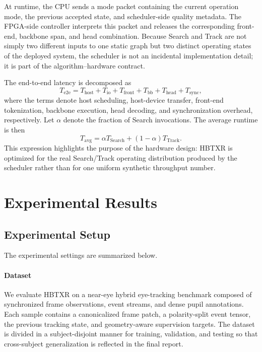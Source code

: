 \documentclass[journal]{IEEEtran}
\begin{document}
At runtime, the CPU sends a mode packet containing the current operation mode, the previous accepted state, and scheduler-side quality metadata. The FPGA-side controller interprets this packet and releases the corresponding front-end, backbone span, and head combination. Because Search and Track are not simply two different inputs to one static graph but two distinct operating states of the deployed system, the scheduler is not an incidental implementation detail; it is part of the algorithm--hardware contract.

The end-to-end latency is decomposed as
\begin{equation}
T_{\mathrm{e2e}} = T_{\mathrm{host}} + T_{\mathrm{io}} + T_{\mathrm{front}} + T_{\mathrm{bb}} + T_{\mathrm{head}} + T_{\mathrm{sync}},
\end{equation}
where the terms denote host scheduling, host-device transfer, front-end tokenization, backbone execution, head decoding, and synchronization overhead, respectively. Let $\alpha$ denote the fraction of Search invocations. The average runtime is then
\begin{equation}
T_{\mathrm{avg}} = \alpha T_{\mathrm{Search}} + (1-\alpha)T_{\mathrm{Track}}.
\end{equation}
This expression highlights the purpose of the hardware design: HBTXR is optimized for the real Search/Track operating distribution produced by the scheduler rather than for one uniform synthetic throughput number.

\section{Experimental Results}
\subsection{Experimental Setup}
The experimental settings are summarized below.

\paragraph*{Dataset}
We evaluate HBTXR on a near-eye hybrid eye-tracking benchmark composed of synchronized frame observations, event streams, and dense pupil annotations. Each sample contains a canonicalized frame patch, a polarity-split event tensor, the previous tracking state, and geometry-aware supervision targets. The dataset is divided in a subject-disjoint manner for training, validation, and testing so that cross-subject generalization is reflected in the final report.
\end{document}
